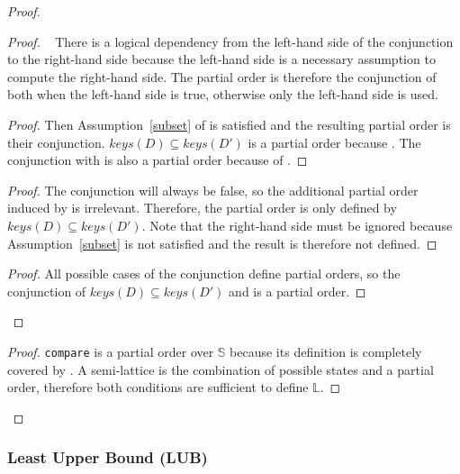 \documentclass[9pt, oneside]{article}   	%
\begin{document}
\begin{proof}
			\begin{proof}
				\pfsketch~ There is a logical dependency from the left-hand side of the conjunction to the right-hand side because the left-hand side is a necessary assumption to compute the right-hand side. The partial order is therefore the conjunction of both when the left-hand side is true, otherwise only the left-hand side is used.
				\begin{proof}
					Then Assumption~\ref{subset} of  is satisfied and the resulting partial order is their conjunction. $\textit{keys}(D) \subseteq \textit{keys}(D')$ is a partial order because . The conjunction with  is also a partial order because of .
				\end{proof}
				
				\begin{proof}
					The conjunction will always be false, so the additional partial order induced by  is irrelevant. Therefore, the partial order is only defined by $\textit{keys}(D) \subseteq \textit{keys}(D')$. Note that the right-hand side must be ignored because Assumption~\ref{subset} is not satisfied and the result is therefore not defined.
				\end{proof}
				
				\qedstep
				\begin{proof}
					All possible cases of the conjunction define partial orders, so the conjunction of $\textit{keys}(D) \subseteq \textit{keys}(D')$ and  is a partial order.
				\end{proof}
			\end{proof}
			
			\qedstep
			\begin{proof}
				\texttt{compare} is a partial order over $\mathds{S}$ because its definition is completely covered by . A semi-lattice is the combination of possible states and a partial order, therefore both conditions are sufficient to define $\mathds{L}$.
			\end{proof}			
	\end{proof}

\subsubsection{Least Upper Bound (LUB)}
\label{sec:longer-proofs:lub}
\end{document}
